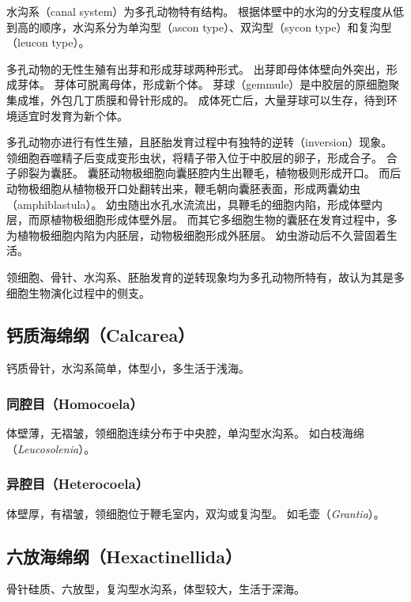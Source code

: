 \documentclass[11pt]{article}
\begin{document}
\newline

水沟系（canal system）为多孔动物特有结构。
根据体壁中的水沟的分支程度从低到高的顺序，水沟系分为单沟型（ascon type）、双沟型（sycon type）和复沟型（leucon type）。

\newline

多孔动物的无性生殖有出芽和形成芽球两种形式。
出芽即母体体壁向外突出，形成芽体。
芽体可脱离母体，形成新个体。
芽球（gemmule）是中胶层的原细胞聚集成堆，外包几丁质膜和骨针形成的。
成体死亡后，大量芽球可以生存，待到环境适宜时发育为新个体。

\newline

多孔动物亦进行有性生殖，且胚胎发育过程中有独特的逆转（inversion）现象。
领细胞吞噬精子后变成变形虫状，将精子带入位于中胶层的卵子，形成合子。
合子卵裂为囊胚。
囊胚动物极细胞向囊胚腔内生出鞭毛，植物极则形成开口。
而后动物极细胞从植物极开口处翻转出来，鞭毛朝向囊胚表面，形成两囊幼虫（amphiblastula）。
幼虫随出水孔水流流出，具鞭毛的细胞内陷，形成体壁内层，而原植物极细胞形成体壁外层。
而其它多细胞生物的囊胚在发育过程中，多为植物极细胞内陷为内胚层，动物极细胞形成外胚层。
幼虫游动后不久营固着生活。

\newline

领细胞、骨针、水沟系、胚胎发育的逆转现象均为多孔动物所特有，故认为其是多细胞生物演化过程中的侧支。

\subsection{钙质海绵纲（Calcarea）}
钙质骨针，水沟系简单，体型小，多生活于浅海。

\subsubsection{同腔目（Homocoela）}
体壁薄，无褶皱，领细胞连续分布于中央腔，单沟型水沟系。
如白枝海绵（\textit{Leucosolenia}）。

\subsubsection{异腔目（Heterocoela）}
体壁厚，有褶皱，领细胞位于鞭毛室内，双沟或复沟型。
如毛壶（\textit{Grantia}）。

\subsection{六放海绵纲（Hexactinellida）}
骨针硅质、六放型，复沟型水沟系，体型较大，生活于深海。
\end{document}

